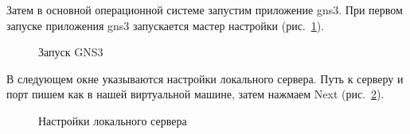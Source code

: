 \documentclass[
  english,
  russian,
  12pt,
  a4paper,
  DIV=11,
  numbers=noendperiod]{scrreprt}
\begin{document}
Затем в основной операционной системе запустим приложение gns3. При
первом запуске приложения gns3 запускается мастер настройки
(рис.~\ref{fig-011}).

\begin{figure}


\caption{\label{fig-011}Запуск GNS3}

\end{figure}%

В следующем окне указываются настройки локального сервера. Путь к
серверу и порт пишем как в нашей виртуальной машине, затем нажмаем Next
(рис.~\ref{fig-012}).

\begin{figure}


\caption{\label{fig-012}Настройки локального сервера}

\end{figure}%
\end{document}
